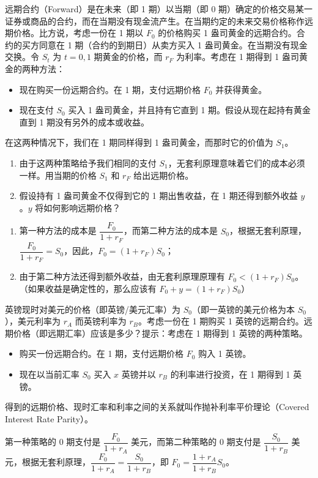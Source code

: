 \begin{problem}
 远期合约（Forward）是在未来（即 1 期）以当期（即 0 期）确定的价格交易某一证券或商品的合约，而在当期没有现金流产生。在当期约定的未来交易价格称作远期价格。比方说，考虑一份在 1 期以 $F_{0}$ 的价格购买 1 盎司黄金的远期合约。合约的买方同意在 1 期（合约的到期日）从卖方买入 1 盎司黄金。在当期没有现金交换。令 $S_{t}$ 为 $t=0,1$ 期黄金的价格，而 $r_{F}$ 为利率。考虑在 1 期得到 1 盎司黄金的两种方法：
\begin{itemize}
    \item 现在购买一份远期合约。在 1 期，支付远期价格 $F_{0}$ 并获得黄金。
    \item 现在支付 $S_{0}$ 买入 1 盎司黄金，并且持有它直到 1 期。假设从现在起持有黄金直到 1 期没有另外的成本或收益。
\end{itemize}
在这两种情况下，我们在 1 期同样得到 1 盎司黄金，而那时它的价值为 $S_{1}$。
\begin{enumerate}[label=(\alph*)]
    \item 由于这两种策略给予我们相同的支付 $S_{1}$，无套利原理意味着它们的成本必须一样。用当期的价格 $S_{1}$ 和 $r_{F}$ 给出远期价格。
    \item 假设持有 1 盎司黄金不仅得到它的 1 期出售收益，在 1 期还得到额外收益 $y$。$y$ 将如何影响远期价格？
\end{enumerate}
\end{problem}
\begin{solution}
\begin{enumerate}[label=(\alph*)]
    \item 第一种方法的成本是 $\dfrac{F_{0}}{1+r_{F}}$，而第二种方法的成本是 $S_{0}$，根据无套利原理，$\dfrac{F_{0}}{1+r_{F}}=S_{0}$，因此，$F_{0}=(1+r_{F})S_{0}$；
    \item 由于第二种方法还得到额外收益，由无套利原理原理有 $F_{0}<(1+r_{F})S_{0}$。（如果收益是确定性的，那么应该有 $F_{0}+y=(1+r_{F})S_{0}$）
\end{enumerate}
\end{solution}

\begin{problem}
 英镑现时对美元的价格（即英镑/美元汇率）为 $S_{0}$（即一英镑的美元价格为本 $S_{0}$），美元利率为 $r_{A}$ 而英镑利率为 $r_{B}$。考虑一份在 1 期购买 1 英镑的远期合约。远期价格（即远期汇率）应该是多少？提示：考虑在 1 期得到 1 英镑的两种策略。
\begin{itemize}
    \item 购买一份远期合约。在 1 期，支付远期价格 $F_{0}$ 购入 1 英镑。
    \item 现在以当前汇率 $S_{0}$ 买入 $x$ 英镑并以 $r_{B}$ 的利率进行投资，在 1 期得到 1 英镑。
\end{itemize}
得到的远期价格、现时汇率和利率之间的关系就叫作抛补利率平价理论（Covered Interest Rate Parity）。
\end{problem}
\begin{solution}
第一种策略的 0 期支付是 $\dfrac{F_{0}}{1+r_{A}}$ 美元，而第二种策略的 0 期支付是 $\dfrac{S_{0}}{1+r_{B}}$ 美元，根据无套利原理，$\dfrac{F_{0}}{1+r_{A}}=\dfrac{S_{0}}{1+r_{B}}$，即 $F_{0}=\dfrac{1+r_{A}}{1+r_{B}}S_{0}$。
\end{solution}


